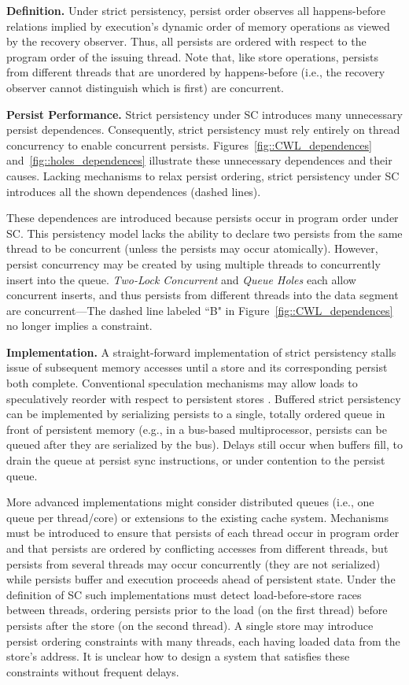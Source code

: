 \textbf{Definition.}
Under strict persistency, persist order observes all happens-before relations implied by execution's dynamic order of memory operations as viewed by the recovery observer.
Thus, all persists are ordered with respect to the program order of the issuing thread.
Note that, like store operations, persists from different threads that are unordered by happens-before (i.e., the recovery observer cannot distinguish which is first) are concurrent.

\textbf{Persist Performance.}
Strict persistency under SC introduces many unnecessary persist dependences.
Consequently, strict persistency must rely entirely on thread concurrency to enable concurrent persists.
Figures~\ref{fig::CWL_dependences} and~\ref{fig::holes_dependences} illustrate these unnecessary dependences and their causes.
Lacking mechanisms to relax persist ordering, strict persistency under SC introduces all the shown dependences (dashed lines).

These dependences are introduced because persists occur in program order under SC.
This persistency model lacks the ability to declare two persists from the same thread to be concurrent (unless the persists may occur atomically).
However, persist concurrency may be created by using multiple threads to concurrently insert into the queue.
\emph{Two-Lock Concurrent} and \emph{Queue Holes} each allow concurrent inserts, and thus persists from different threads into the data segment are concurrent---The dashed line labeled ``B" in Figure~\ref{fig::CWL_dependences} no longer implies a constraint.

\textbf{Implementation.}
A straight-forward implementation of strict persistency stalls issue of subsequent memory accesses until a store and its corresponding persist both complete.
Conventional speculation mechanisms may allow loads to speculatively reorder with respect to persistent stores \cite{Gharachorloo91}.
Buffered strict persistency can be implemented by serializing persists to a single, totally ordered queue in front of persistent memory (e.g., in a bus-based multiprocessor, persists can be queued after they are serialized by the bus).
Delays still occur when buffers fill, to drain the queue at persist sync instructions, or under contention to the persist queue.

More advanced implementations might consider distributed queues (i.e., one queue per thread/core) or extensions to the existing cache system.
Mechanisms must be introduced to ensure that persists of each thread occur in program order and that persists are ordered by conflicting accesses from different threads, but persists from several threads may occur concurrently (they are not serialized) while persists buffer and execution proceeds ahead of persistent state.
Under the definition of SC such implementations must detect load-before-store races between threads, ordering persists prior to the load (on the first thread) before persists after the store (on the second thread).
A single store may introduce persist ordering constraints with many threads, each having loaded data from the store's address.
It is unclear how to design a system that satisfies these constraints without frequent delays.

